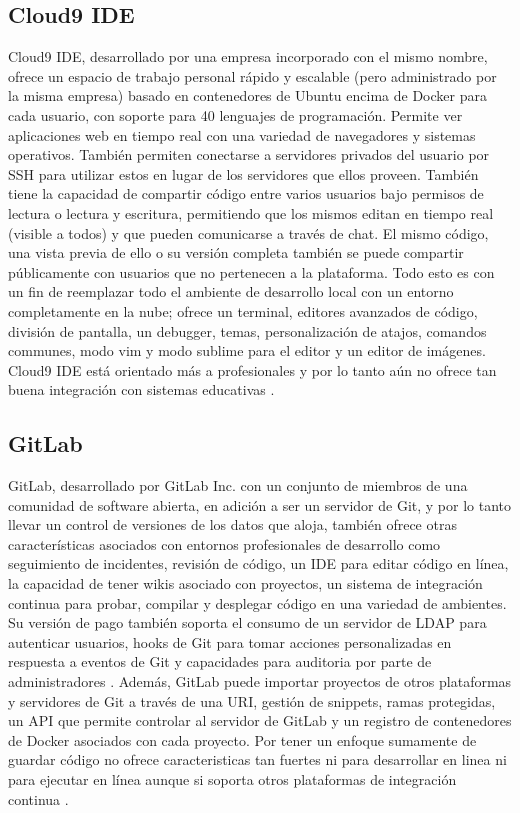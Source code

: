 \subsection{Cloud9 IDE}
Cloud9 IDE, desarrollado por una empresa incorporado con el mismo nombre, ofrece un espacio de trabajo personal rápido y escalable (pero administrado por la misma empresa) basado en contenedores de Ubuntu encima de Docker para cada usuario, con soporte para 40 lenguajes de programación. Permite ver aplicaciones web en tiempo real con una variedad de navegadores y sistemas operativos. También permiten conectarse a servidores privados del usuario por SSH para utilizar estos en lugar de los servidores que ellos proveen. También tiene la capacidad de compartir código entre varios usuarios bajo permisos de lectura o lectura y escritura, permitiendo que los mismos editan en tiempo real (visible a todos) y que pueden comunicarse a través de chat. El mismo código, una vista previa de ello o su versión completa también se puede compartir públicamente con usuarios que no pertenecen a la plataforma. Todo esto es con un fin de reemplazar todo el ambiente de desarrollo local con un entorno completamente en la nube; ofrece un terminal, editores avanzados de código, división de pantalla, un debugger, temas, personalización de atajos, comandos communes, modo vim y modo sublime para el editor y un editor de imágenes. Cloud9 IDE está orientado más a profesionales y por lo tanto aún no ofrece tan buena integración con sistemas educativas \citep{Cloud9-Home}.

\subsection{GitLab}
GitLab, desarrollado por GitLab Inc. con un conjunto de miembros de una comunidad de software abierta, en adición a ser un servidor de Git, y por lo tanto llevar un control de versiones de los datos que aloja, también ofrece otras características asociados con entornos profesionales de desarrollo como seguimiento de incidentes, revisión de código, un IDE para editar código en línea, la capacidad de tener wikis asociado con proyectos, un sistema de integración continua para probar, compilar y desplegar código en una variedad de ambientes. Su versión de pago también soporta el consumo de un servidor de LDAP para autenticar usuarios, hooks de Git para tomar acciones personalizadas en respuesta a eventos de Git y capacidades para auditoria por parte de administradores \citep{GitLab}. Además, GitLab puede importar proyectos de otros plataformas y servidores de Git a través de una URI, gestión de snippets, ramas protegidas, un API que permite controlar al servidor de GitLab y un registro de contenedores de Docker asociados con cada proyecto. Por tener un enfoque sumamente de guardar código no ofrece caracteristicas tan fuertes ni para desarrollar en linea ni para ejecutar en línea aunque si soporta otros plataformas de integración continua \citep{GitLab-Features}.

